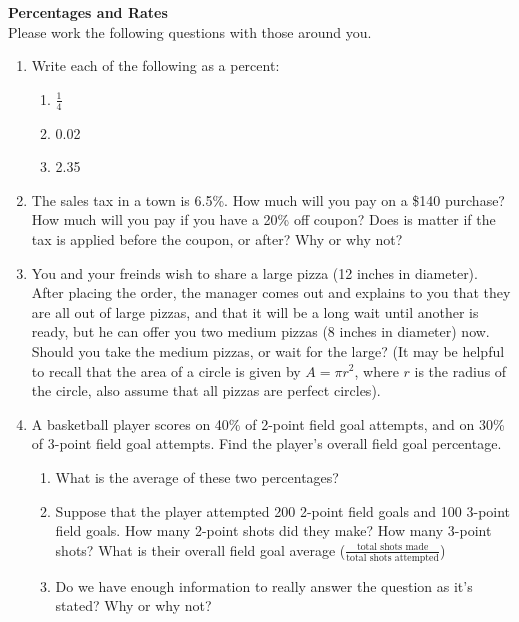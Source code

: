 \documentclass{article}
\begin{document}
{\large\bf Percentages and Rates}\\

Please work the following questions with those around you. 

\begin{enumerate}
\item Write each of the following as a percent:
    \begin{enumerate}
    \item $\frac{1}{4}$
    \item 0.02
    \item 2.35
    \end{enumerate}

\item The sales tax in a town is 6.5\%. How much will you pay on a \$140
purchase? How much will you pay if you have a 20\% off coupon? Does is matter if
the tax is applied before the coupon, or after? Why or why not? 

\vfill

\item You and your freinds wish to share a large pizza (12 inches in diameter). 
After placing the order, the manager comes out and explains to you that 
they are all out of large pizzas, and that it will be a long wait until 
another is ready, but he can offer you two medium pizzas (8 inches in 
diameter) now. Should you take the medium pizzas, or wait for the large? 
(It may be helpful to recall that the area of a circle is given by $A=\pi r^2$,
where $r$ is the radius of the circle, also assume that all pizzas are perfect
circles).

\vfill\newpage

\item A basketball player scores on 40\% of 2-point field goal attempts, and on
30\% of 3-point field goal attempts. Find the player's overall field goal
percentage. 

\begin{enumerate}
\item What is the average of these two percentages? \underline{\hspace{1in}}
\item Suppose that the player attempted 200 2-point field goals and 100 3-point
field goals. How many 2-point shots did they make? How many 3-point shots? What
is their overall field goal average ($\frac{\text{total shots made}}{\text{total
shots attempted}}$)
\item Do we have enough information to really answer the question as it's
stated? Why or why not? 
\end{enumerate}


\end{enumerate}
\end{document}
